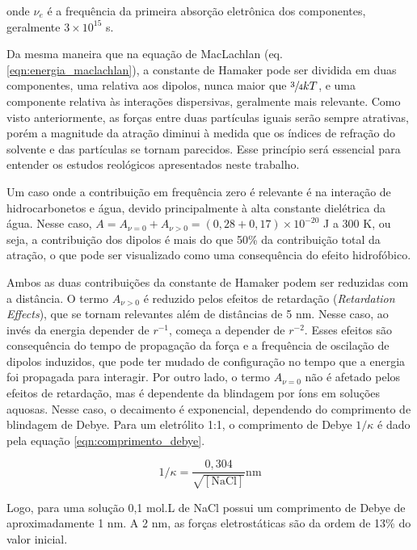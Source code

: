 	\noindent onde \(\nu_e\) é a frequência da primeira absorção eletrônica dos componentes, geralmente \(3 \times 10^{15}\) s\menosUm.
	
	Da mesma maneira que na equação de MacLachlan (eq. \ref{eqn:energia_maclachlan}), a constante de Hamaker pode ser dividida em duas componentes, uma relativa aos dipolos, nunca maior que \(\sfrac{3}{4}kT\), e uma componente relativa às interações dispersivas, geralmente mais relevante. Como visto anteriormente, as forças entre duas partículas iguais serão sempre atrativas, porém a magnitude da atração diminui à medida que os índices de refração do solvente e das partículas se tornam parecidos. Esse princípio será essencial para entender os estudos reológicos apresentados neste trabalho.
	
	Um caso onde a contribuição em frequência zero é relevante é na interação de hidrocarbonetos e água, devido principalmente à alta constante dielétrica da água. Nesse caso, \(A = A_{\nu=0} + A_{\nu>0} = (0,28 + 0,17) \times 10^{-20} \) J a 300 K, ou seja, a contribuição dos dipolos é mais do que 50\% da contribuição total da atração, o que pode ser visualizado como uma consequência do efeito hidrofóbico. %
	
	Ambos as duas contribuições da constante de Hamaker podem ser reduzidas com a distância. O termo \(A_{\nu > 0}\) é reduzido pelos efeitos de retardação (\emph{Retardation Effects}), que se tornam relevantes além de distâncias de 5 nm. Nesse caso, ao invés da energia depender de \(r^{-1}\), começa a depender de \(r^{-2}\). Esses efeitos são consequência do tempo de propagação da força e a frequência de oscilação de dipolos induzidos, que pode ter mudado de configuração no tempo que a energia foi propagada para interagir. Por outro lado, o termo \(A_{\nu = 0}\) não é afetado pelos efeitos de retardação, mas é dependente da blindagem por íons em soluções aquosas. Nesse caso, o decaimento é exponencial, dependendo do comprimento de blindagem de Debye. Para um eletrólito 1:1, o comprimento de Debye \(1/\kappa\) é dado pela equação \ref{eqn:comprimento_debye}.
	
	\begin{equation}
		1/\kappa = \dfrac{0{,}304}{\sqrt{\left[ \mathrm{NaCl} \right] }} \textrm{nm}
		\label{eqn:comprimento_debye}
	\end{equation} 
	
	Logo, para uma solução 0,1 mol.L\menosUm{} de NaCl possui um comprimento de Debye de aproximadamente 1 nm. A 2 nm, as forças eletrostáticas são da ordem de 13\% do valor inicial.
	
